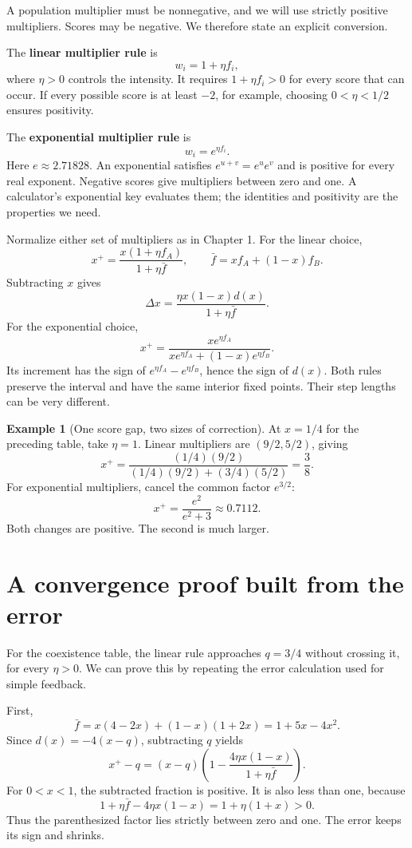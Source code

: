 \documentclass[11pt,oneside,openany]{book}
\theoremstyle{definition}
\newtheorem{example}{Example}[chapter]
\theoremstyle{remark}
\numberwithin{equation}{chapter}
\begin{document}
A population multiplier must be nonnegative, and we will use strictly positive multipliers. Scores may be negative. We therefore state an explicit conversion.

The \textbf{linear multiplier rule} is \[w_i=1+\eta f_i,\] where \(\eta>0\) controls the intensity. It requires \(1+\eta f_i>0\) for every score that can occur. If every possible score is at least \(-2\), for example, choosing \(0<\eta<1/2\) ensures positivity.

The \textbf{exponential multiplier rule} is \[w_i=e^{\eta f_i}.\] Here \(e\approx2.71828\). An exponential satisfies \(e^{u+v}=e^u e^v\) and is positive for every real exponent. Negative scores give multipliers between zero and one. A calculator's exponential key evaluates them; the identities and positivity are the properties we need.

Normalize either set of multipliers as in Chapter 1. For the linear choice, \[x^+=\frac{x(1+\eta f_A)}{1+\eta\bar f},\qquad
\bar f=xf_A+(1-x)f_B.\] Subtracting \(x\) gives \[\Delta x=\frac{\eta x(1-x)d(x)}{1+\eta\bar f}.\] For the exponential choice, \[x^+=\frac{xe^{\eta f_A}}{xe^{\eta f_A}+(1-x)e^{\eta f_B}}.\] Its increment has the sign of \(e^{\eta f_A}-e^{\eta f_B}\), hence the sign of \(d(x)\). Both rules preserve the interval and have the same interior fixed points. Their step lengths can be very different.

\begin{example}[One score gap, two sizes of correction]

At \(x=1/4\) for the preceding table, take \(\eta=1\). Linear multipliers are \((9/2,5/2)\), giving \[x^+=\frac{(1/4)(9/2)}{(1/4)(9/2)+(3/4)(5/2)}=\frac38.\] For exponential multipliers, cancel the common factor \(e^{3/2}\): \[x^+=\frac{e^2}{e^2+3}\approx0.7112.\] Both changes are positive. The second is much larger.

\end{example}

\section{A convergence proof built from the error}\label{ch02-a-convergence-proof-built-from-the-error}

For the coexistence table, the linear rule approaches \(q=3/4\) without crossing it, for every \(\eta>0\). We can prove this by repeating the error calculation used for simple feedback.

First, \[\bar f=x(4-2x)+(1-x)(1+2x)=1+5x-4x^2.\] Since \(d(x)=-4(x-q)\), subtracting \(q\) yields \[x^+-q=(x-q)\left(1-\frac{4\eta x(1-x)}{1+\eta\bar f}\right).\] For \(0<x<1\), the subtracted fraction is positive. It is also less than one, because \[1+\eta\bar f-4\eta x(1-x)=1+\eta(1+x)>0.\] Thus the parenthesized factor lies strictly between zero and one. The error keeps its sign and shrinks.
\end{document}

